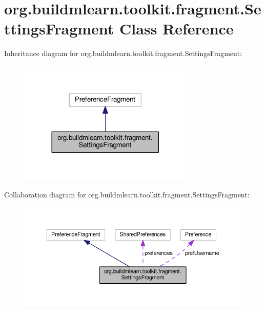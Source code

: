 \hypertarget{classorg_1_1buildmlearn_1_1toolkit_1_1fragment_1_1SettingsFragment}{}\section{org.\+buildmlearn.\+toolkit.\+fragment.\+Settings\+Fragment Class Reference}
\label{classorg_1_1buildmlearn_1_1toolkit_1_1fragment_1_1SettingsFragment}


Inheritance diagram for org.\+buildmlearn.\+toolkit.\+fragment.\+Settings\+Fragment\+:
\nopagebreak
\begin{figure}[H]
\begin{center}
\leavevmode
\includegraphics[width=236pt]{classorg_1_1buildmlearn_1_1toolkit_1_1fragment_1_1SettingsFragment__inherit__graph}
\end{center}
\end{figure}


Collaboration diagram for org.\+buildmlearn.\+toolkit.\+fragment.\+Settings\+Fragment\+:
\nopagebreak
\begin{figure}[H]
\begin{center}
\leavevmode
\includegraphics[width=350pt]{classorg_1_1buildmlearn_1_1toolkit_1_1fragment_1_1SettingsFragment__coll__graph}
\end{center}
\end{figure}
